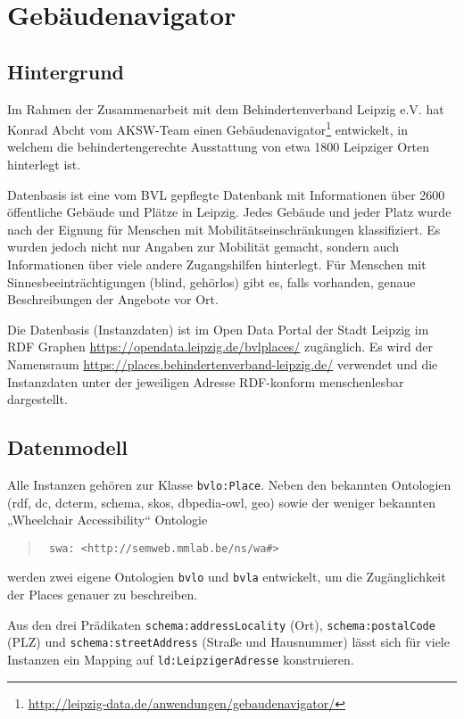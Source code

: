 \documentclass[a4paper,11pt]{article}
\begin{document}
\section{Gebäudenavigator}

\subsection{Hintergrund}
Im Rahmen der Zusammenarbeit mit dem Behindertenverband Leipzig e.V. hat Konrad
Abcht vom AKSW-Team einen
Gebäudenavigator\footnote{\url{http://leipzig-data.de/anwendungen/gebaudenavigator/}}
entwickelt, in welchem die behindertengerechte Ausstattung von etwa 1800
Leipziger Orten hinterlegt ist.

Datenbasis ist eine vom BVL gepflegte Datenbank mit Informationen über 2600
öffentliche Gebäude und Plätze in Leipzig. Jedes Gebäude und jeder Platz wurde
nach der Eignung für Menschen mit Mobilitätseinschränkungen klassifiziert. Es
wurden jedoch nicht nur Angaben zur Mobilität gemacht, sondern auch
Informationen über viele andere Zugangshilfen hinterlegt. Für Menschen mit
Sinnesbeeinträchtigungen (blind, gehörlos) gibt es, falls vorhanden, genaue
Beschreibungen der Angebote vor Ort.

Die Datenbasis (Instanzdaten) ist im Open Data Portal der Stadt Leipzig im RDF
Graphen \url{https://opendata.leipzig.de/bvlplaces/} zugänglich.  Es wird der
Namensraum \url{https://places.behindertenverband-leipzig.de/} verwendet und
die Instanzdaten unter der jeweiligen Adresse RDF-konform menschenlesbar
dargestellt. 

\subsection{Datenmodell}

Alle Instanzen gehören zur Klasse \texttt{bvlo:Place}.  Neben den bekannten
Ontologien (rdf, dc, dcterm, schema, skos, dbpedia-owl, geo) sowie der weniger
bekannten „Wheelchair Accessibility“ Ontologie
\begin{quote}\tt
  swa: <http://semweb.mmlab.be/ns/wa\#>
\end{quote}
werden zwei eigene Ontologien \texttt{bvlo} und \texttt{bvla} entwickelt, um
die Zugänglichkeit der Places genauer zu beschreiben.

Aus den drei Prädikaten \texttt{schema:addressLocality} (Ort),
\texttt{schema:postalCode} (PLZ) und \texttt{schema:streetAddress} (Straße und
Hausnummer) lässt sich für viele Instanzen ein Mapping auf
\texttt{ld:LeipzigerAdresse} konstruieren.
\end{document}
